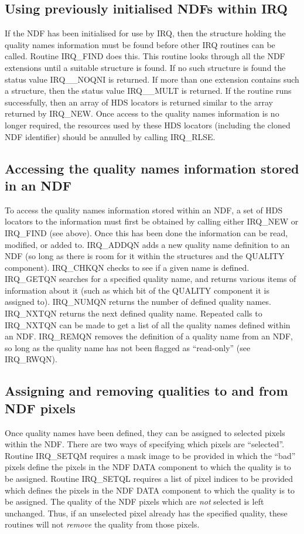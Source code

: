 \subsection{Using previously initialised NDFs within IRQ}
If the NDF has been initialised for use by IRQ, then the structure holding the
quality names information must be found before other IRQ routines can be called.
Routine IRQ\_FIND does this. This routine looks through all the NDF extensions
until a suitable structure is found. If no such structure is found the status
value IRQ\_\_NOQNI is returned. If more than one extension contains such a
structure, then the status value IRQ\_\_MULT is returned. If the routine runs
successfully, then an array of HDS locators is returned similar to the array
returned by IRQ\_NEW. Once access to the quality names information is no longer
required, the resources used by these HDS locators (including the cloned
NDF identifier) should be annulled by calling IRQ\_RLSE. 

\subsection{Accessing the quality names information stored in an NDF}
To access the quality names information stored within an NDF, a set of HDS 
locators to the information must first be obtained by calling either IRQ\_NEW or 
IRQ\_FIND (see above). Once this has been done the information can be read, 
modified, or added to. IRQ\_ADDQN adds a new quality name definition to an NDF 
(so long as there is room for it within the structures and the QUALITY 
component). IRQ\_CHKQN checks to see if a given name is defined. IRQ\_GETQN 
searches for a specified quality name, and 
returns various items of information about it (such as which bit of the QUALITY 
component it is assigned to). IRQ\_NUMQN returns the number of defined quality 
names. IRQ\_NXTQN returns the next defined quality name. Repeated calls to 
IRQ\_NXTQN can be made to get a list of all the quality names defined within an 
NDF. IRQ\_REMQN removes the definition of a quality name from an NDF, so
long as the quality name has not been flagged as ``read-only'' (see
IRQ\_RWQN).

\subsection{Assigning and removing qualities to and from NDF pixels}
Once quality names have been defined, they can be assigned to selected pixels
within the NDF. There are two ways of specifying which pixels are ``selected''.
Routine IRQ\_SETQM requires a mask image to be provided in which the ``bad''
pixels define the pixels in the NDF DATA component to which the quality is to be
assigned. Routine IRQ\_SETQL requires a list of pixel indices to be provided
which defines the pixels in the NDF DATA component to which the quality is to be
assigned. The quality of the NDF pixels which are {\em not} selected is left
unchanged. Thus, if an unselected pixel already has the specified quality, these
routines will not {\em remove} the quality from those pixels. 

